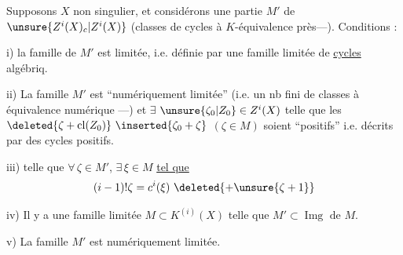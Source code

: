 Supposons  $X$ non singulier, et considérons  une partie $M'$ de $\unsure{Z^i(X)_c|Z^i(X)}$ (classes de cycles à $K$-équivalence près---).  Conditions  :

i) \deleted{$\unsure{\xi}$} la famille de $M'$ est limitée, i.e. définie par une famille limitée de \uline{cycles} algébriq.

ii) La famille  $M'$ est ``numériquement limitée'' (i.e. un nb fini de classes à équivalence numérique ---) et $\exists$   $\unsure{\zeta_0|Z_0}\in Z^i(X)$ telle que les $\deleted{\zeta+\operatorname{cl}(Z_0)}\ \inserted{\zeta_0+\zeta}$ $(\zeta\in M)$ soient ``positifs'' i.e. décrits par des cycles positifs.

iii)    telle que $\forall\,\zeta\in M'$, $\exists\,\xi\in M$ \uline{tel que}
\[
(i-1)!\zeta=c^i(\xi)\ \deleted{+\unsure{\zeta+1}}
\]

iv) Il y a une famille limitée $M\subset K^{(i)}(X)$ telle que $M'\subset\operatorname{Img}\text{ de }M$.

v) La famille $M'$ est numériquement limitée.

